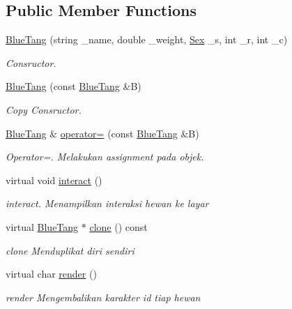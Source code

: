 \subsection*{Public Member Functions}
\begin{DoxyCompactItemize}
\item 
\hyperlink{classBlueTang_a13620a0a3513d70caaf1dd7a7d70389b}{Blue\+Tang} (string \+\_\+name, double \+\_\+weight, \hyperlink{sex_8h_a2633cb393c68bb2ee8080db58fb7ba93}{Sex} \+\_\+s, int \+\_\+r, int \+\_\+c)
\begin{DoxyCompactList}\small\item\em Consructor. \end{DoxyCompactList}\item 
\hyperlink{classBlueTang_adaecf8dcc061e6c4cae3b4e61ea83238}{Blue\+Tang} (const \hyperlink{classBlueTang}{Blue\+Tang} \&B)
\begin{DoxyCompactList}\small\item\em Copy Consructor. \end{DoxyCompactList}\item 
\hyperlink{classBlueTang}{Blue\+Tang} \& \hyperlink{classBlueTang_af87c19bccd039c3978c989c6ec0616fc}{operator=} (const \hyperlink{classBlueTang}{Blue\+Tang} \&B)
\begin{DoxyCompactList}\small\item\em Operator=. Melakukan assignment pada objek. \end{DoxyCompactList}\item 
virtual void \hyperlink{classBlueTang_a2cb5619f4bb30b19f54fe3c062598422}{interact} ()
\begin{DoxyCompactList}\small\item\em interact. Menampilkan interaksi hewan ke layar \end{DoxyCompactList}\item 
virtual \hyperlink{classBlueTang}{Blue\+Tang} $\ast$ \hyperlink{classBlueTang_a2b4ac8cf3cddaa66c9cc361c6cc3361b}{clone} () const 
\begin{DoxyCompactList}\small\item\em clone Menduplikat diri sendiri \end{DoxyCompactList}\item 
virtual char \hyperlink{classBlueTang_a6679edaef26a7ae9c94e8a3ca633af54}{render} ()
\begin{DoxyCompactList}\small\item\em render Mengembalikan karakter id tiap hewan \end{DoxyCompactList}\item 

\end{DoxyCompactItemize}
